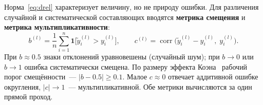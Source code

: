 Норма~\eqref{eq:drel} характеризует величину, но не природу ошибки. Для
различения случайной и систематической составляющих вводятся
\textbf{метрика смещения} и \textbf{метрика мультипликативности}:
\begin{equation}
    \label{eq:diag}
    b^{(l)} = \frac{1}{n}\sum_{i=1}^{n}\mathbf{1}\bigl[\tilde y^{(l)}_i > y^{(l)}_i\bigr],
    \qquad
    c^{(l)} = \operatorname{corr}\bigl(\tilde y^{(l)}_i - y^{(l)}_i,\; y^{(l)}_i\bigr).
\end{equation}
При $b\approx0.5$ знаки отклонений уравновешены (случайный шум); при
$b\to0$ или $b\to1$ ошибка систематически смещена. По размеру эффекта
Коэна~\cite{Cohen1988} рабочий порог смещённости~--- $|b-0.5|\ge0.1$. Малое
$c\approx0$ отвечает аддитивной ошибке округления, $|c|\to1$~--- мультипликативной.
Обе метрики вычисляются за один прямой проход.
